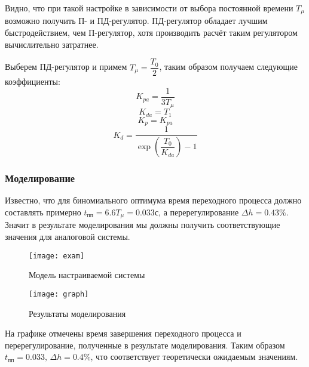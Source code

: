             Видно, что при такой настройке в зависимости от выбора постоянной времени $ T_\mu $ возможно получить П- и ПД-регулятор. ПД-регулятор обладает лучшим быстродействием, чем П-регулятор, хотя производить расчёт таким регулятором вычислительно затратнее.
            
            Выберем ПД-регулятор и примем $ T_\mu = \dfrac{T_0}{2} $, таким образом получаем следующие коэффициенты:
            $$ K_{pa} = \dfrac{1}{3T_\mu} $$
            $$ K_{da} = T_1 $$
            $$ K_p = K_{pa} $$
            $$ K_d = \dfrac{1}{\exp\left(\dfrac{T_0}{K_{da}}\right) - 1} $$
        \subsubsection{Моделирование}
            Известно, что для биномиального оптимума время переходного процесса должно составлять примерно $ t_\text{пп} = 6.6T_\mu = 0.033 \text{с} $, а перерегулирование $ \Delta h = 0.43\% $. Значит в результате моделирования мы должны получить соответствующие значения для аналоговой системы.
            \begin{figure}[H]
                \centering\texttt{[image: exam]}
                \caption{Модель настраиваемой системы}
            \end{figure}
            \begin{figure}[H]
                \centering\texttt{[image: graph]}
                \caption{Результаты моделирования}
            \end{figure}
            На графике отмечены время завершения переходного процесса и перерегулирование, полученные в результате моделирования. Таким образом $ t_\text{пп} = 0.033,\,\Delta h = 0.4\% $, что соответствует теоретически ожидаемым значениям.
